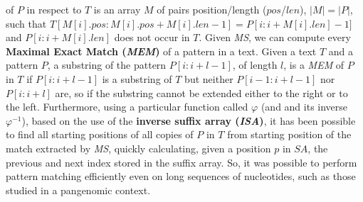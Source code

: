 \documentclass[a4paper,11pt, oneside]{article}
\begin{document}
of $P$ in respect to $T$ is an array $M$ of pairs position/length ($pos$/$len$),
$|M|=|P|$, such that $T[M[i].pos:M[i].pos+M[i].len-1]=P[i:i+M[i].len]-1]$ and
$P[i:i+M[i].len]$ does not occur in $T$. Given \textit{MS}, we can compute every
\textbf{Maximal Exact Match (\textit{MEM})} of a pattern in a text. Given a
text $T$ and a pattern $P$, a substring of the pattern $P[i : i+l-1]$, of length
$l$, is a \textit{MEM} of $P$ in $T$ if $P[i:i+l-1]$ is a substring of $T$ but
neither $P[i-1:i+l-1]$ nor $P[i:i+l]$ are, so if the substring cannot be
extended either to the right or to the left. Furthermore, using a particular
function called $\varphi$ (and and its inverse $\varphi^{-1}$), based on the use
of the \textbf{inverse suffix array (\textit{ISA})}, it has been possible to
find all starting positions of all copies of $P$ in $T$ from starting position
of the match extracted by \textit{MS}, quickly calculating, given a position $p$
in $SA$, the previous and next index stored in the suffix array.
So, it was possible to perform pattern matching
efficiently even on long sequences of nucleotides, such as those studied in
a pangenomic context.
\end{document}

